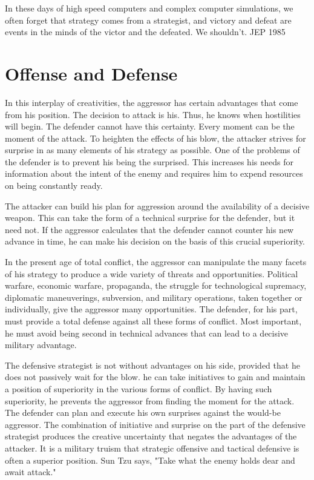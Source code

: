 \begin{mdframed}[backgroundcolor=black!10]
In these days of high speed computers and complex computer simulations, we often forget that strategy comes from a strategist, and victory and defeat are events in the minds of the victor and the defeated. We shouldn't. JEP 1985
\end{mdframed}

\section{Offense and Defense}
In this interplay of creativities, the aggressor has certain advantages that come from his position. The decision to attack is his. Thus, he knows when hostilities will begin. The defender cannot have this certainty. Every moment can be the moment of the attack. To heighten the effects of his blow, the attacker strives for surprise in as many elements of his strategy as possible. One of the problems of the defender is to prevent his being the surprised. This increases his needs for information about the intent of the enemy and requires him to expend resources on being constantly ready.

The attacker can build his plan for aggression around the availability of a decisive weapon. This can take the form of a technical surprise for the defender, but it need not. If the aggressor calculates that the defender cannot counter his new advance in time, he can make his decision on the basis of this crucial superiority.

In the present age of total conflict, the aggressor can manipulate the many facets of his strategy to produce a wide variety of threats and opportunities. Political warfare, economic warfare, propaganda, the struggle for technological supremacy, diplomatic maneuverings, subversion, and military operations, taken together or individually, give the aggressor many opportunities. The defender, for his part, must provide a total defense against all these forms of conflict. Most important, he must avoid being second in technical advances that can lead to a decisive military advantage.

The defensive strategist is not without advantages on his side, provided that he does not passively wait for the blow. he can take initiatives to gain and maintain a position of superiority in the various forms of conflict. By having such superiority, he prevents the aggressor from finding the moment for the attack. The defender can plan and execute his own surprises against the would-be aggressor. The combination of initiative and surprise on the part of the defensive strategist produces the creative uncertainty that negates the advantages of the attacker. It is a military truism that strategic offensive and tactical defensive is often a superior position. Sun Tzu says, "Take what the enemy holds dear and await attack."

